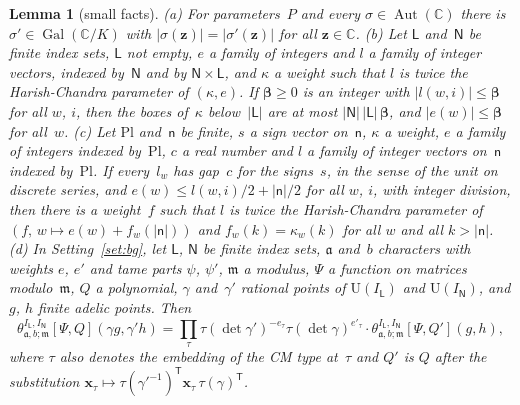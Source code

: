 \documentclass[11pt,a4paper]{article}
\newcommand{\m}[1]{\mbox{$#1$}}        %
\theoremstyle{plainx}
\newtheorem{lemma}[theorem]{Lemma}
\theoremstyle{uprightx}
\newcommand{\CC}{\mathbb{C}}
\newcommand{\ix}[1]{\mathsf{#1}}
\newcommand{\UU}{\mathrm{U}}
\newcommand{\tk}[7]{\theta^{#1,#2}_{#3,#4;#5}[#6,#7]}
\newcommand{\AutC}{\operatorname{Aut}(\CC)}
\newcommand{\transp}{^{\mathsf{T}}}
\newcommand{\Plc}{\mathrm{Pl}}         %
\begin{document}
\begin{lemma}[small facts]\label{l:small}
\textup{(a)} For parameters~$P$ and every \m{\sigma\in\AutC} there is \m{\sigma'\in\operatorname{Gal}(\CC/K)} with
\m{|\sigma(\mathbf{z})|=|\sigma'(\mathbf{z})|} for all \m{\mathbf{z}\in\CC}.
\textup{(b)} Let \m{\ix L} and~\m{\ix N} be finite index sets, \m{\ix L} not empty, $e$ a family of integers and $l$
a family of integer vectors, indexed by~$\ix N$ and by \m{\ix N\times\ix L}, and $\kappa$ a weight such that $l$ is
twice the Harish-Chandra parameter of \m{(\kappa,e)}. If \m{\boldsymbol{\beta}\ge0} is an integer with \m{|l(w,i)|\le\boldsymbol{\beta}} for all
$w$, $i$, then the boxes of~$\kappa$ below~\m{|\ix L|} are at most \m{|\ix N|\,|\ix L|\,\boldsymbol{\beta}}, and \m{|e(w)|\le\boldsymbol{\beta}}
for all~$w$.
\textup{(c)} Let $\Plc$ and~$\ix n$ be finite, $s$ a sign vector on~$\ix n$, $\kappa$ a weight, $e$ a family of
integers indexed by~$\Plc$, $c$ a real number and $l$ a family of integer vectors on~$\ix n$ indexed by~$\Plc$. If
every~$l_w$ has gap~$c$ for the signs~$s$, in the sense of the unit on discrete series, and
\m{e(w)\le l(w,i)/2+|\ix n|/2} for all $w$, $i$, with integer division, then there is a weight~$f$ such that $l$ is
twice the Harish-Chandra parameter of \m{(f,\,w\mapsto e(w)+f_w(|\ix n|))} and \m{f_w(k)=\kappa_w(k)} for all $w$ and
all \m{k>|\ix n|}.
\textup{(d)} In Setting~\ref{set:bg}, let \m{\ix L}, \m{\ix N} be finite index sets, $\mathfrak{a}$ and~$b$ characters with
weights $e$, $e'$ and tame parts $\psi$, $\psi'$, $\mathfrak{m}$ a modulus, $\Psi$ a function on matrices
modulo~$\mathfrak{m}$, $Q$ a polynomial, $\gamma$ and~$\gamma'$ rational points of \m{\UU(I_{\ix L})} and
\m{\UU(I_{\ix N})}, and $g$, $h$ finite adelic points. Then
\[\tk{I_{\ix L}}{I_{\ix N}}{\mathfrak{a}}{b}{\mathfrak{m}}{\Psi}{Q}(\gamma g,\gamma'h)=\prod_\tau\tau(\det\gamma')^{-e_\tau}\tau(\det\gamma)^{e'_\tau}\cdot
\tk{I_{\ix L}}{I_{\ix N}}{\mathfrak{a}}{b}{\mathfrak{m}}{\Psi}{Q'}(g,h),\]
where $\tau$ also denotes the embedding of the CM type at~$\tau$ and $Q'$ is $Q$ after the substitution
\m{\mathbf{x}_\tau\mapsto\tau(\gamma'^{-1})\transp \mathbf{x}_\tau\,\tau(\gamma)\transp}.
\end{lemma}
\end{document}
